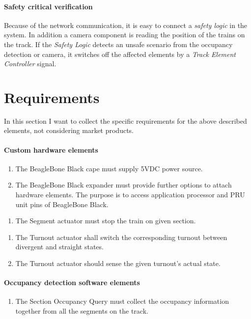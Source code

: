 \paragraph{Safety critical verification}
Because of the network communication, it is easy to connect a \textit{safety logic} in the system. In addition a camera component is reading the position of the trains on the track. If the \textit{Safety Logic} detects an unsafe scenario from the occupancy detection or camera, it switches off the affected elements by a \textit{Track Element Controller} signal.

\section{Requirements}
In this section I want to collect the specific requirements for the above described elements, not considering market products.

\paragraph{Custom hardware elements}
\begin{enumerate}[label=REQ-BBB-\arabic*, leftmargin=*, format=\small]
	\item The BeagleBone Black cape must supply 5VDC power source.
	\item The BeagleBone Black expander must provide further options to attach hardware elements. The purpose is to access application processor and PRU unit pins of BeagleBone Black.
\end{enumerate}

\begin{enumerate}[label=REQ-SA-\arabic*, leftmargin=*, format=\small]
	\item The Segment actuator must stop the train on given section.
\end{enumerate}

\begin{enumerate}[label=REQ-TA-\arabic*, leftmargin=*, format=\small]
	\item The Turnout actuator shall switch the corresponding turnout between divergent and straight states.
	\item The Turnout actuator should sense the given turnout's actual state.
\end{enumerate}

\paragraph{Occupancy detection software elements}
\begin{enumerate}[label=REQ-SOQ-\arabic*, leftmargin=*, format=\small]
	\item The Section Occupancy Query must collect the occupancy information together from all the segments on the track. 
\end{enumerate}

